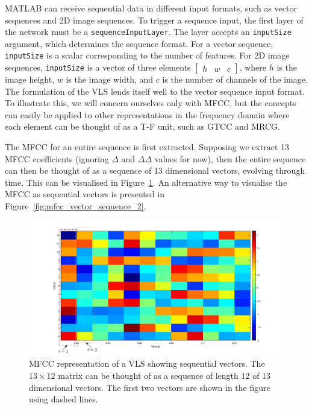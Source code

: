 MATLAB can receive sequential data in different input formats, such as vector
sequences and 2D image sequences. To trigger a sequence input, the first layer
of the network must be a \texttt{sequenceInputLayer}. The layer accepts an
\texttt{inputSize} argument, which determines the sequence format. For a vector
sequence, \texttt{inputSize} is a scalar corresponding to the number of
features. For 2D image sequences, \texttt{inputSize} is a vector of three
elements $\begin{bmatrix} h & w & c \end{bmatrix} $, where $h$ is the image
height, $w$ is the image width, and $c$ is the number of channels of the image.
The formulation of the VLS lends itself well to the vector sequence input
format. To illustrate this, we will concern ourselves only with MFCC, but the
concepts can easily be applied to other representations in the frequency domain
where each element can be thought of as a T-F unit, such as GTCC and MRCG\@.

The MFCC for an entire sequence is first extracted. Supposing we extract 13 MFCC
coefficients (ignoring $\Delta$ and $\Delta\Delta$ values for now), then the
entire sequence can then be thought of as a sequence of 13 dimensional vectors,
evolving through time. This can be visualised in
Figure~\ref{fig:mfcc_vector_sequence}. An alternative way to visualise the MFCC
as sequential vectors is presented in Figure~\ref{fig:mfcc_vector_sequence_2}.

\begin{figure}[ht]
  \centering
  \includegraphics[width=\textwidth]{figures/mfcc_vector_sequence_labelled_2.png}
  \caption{MFCC representation of a VLS showing sequential vectors. The $13
  \times 12$ matrix can be thought of as a sequence of length 12 of 13
dimensional vectors. The first two vectors are shown in the figure using
dashed lines.}\label{fig:mfcc_vector_sequence}
\end{figure}

